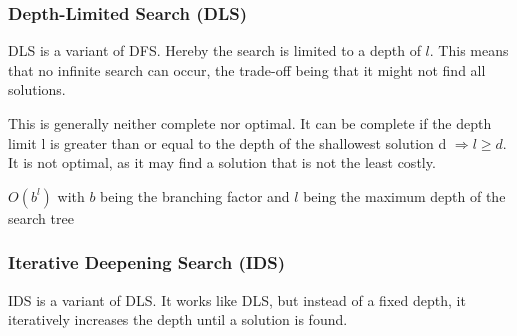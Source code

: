 \documentclass[
../EiKI_Summary.tex,
]
{subfiles}
\begin{document}
\newpage
\subsubsection{Depth-Limited Search (DLS)}
DLS is a variant of DFS. Hereby the search is limited to a depth of $l$. This means that no infinite search can occur, the trade-off being that it might not find all solutions.

\begin{codebox}
    \begin{algorithm}[H]
    \end{algorithm}
\end{codebox}

This is generally neither complete nor optimal. It can be complete if the depth limit l is greater than or equal to the depth of the shallowest solution d $\Rightarrow l \geq d$. It is not optimal, as it may find a solution that is not the least costly.

 $O(b^l)$ with $b$ being the branching factor and $l$ being the maximum depth of the search tree

\subsubsection{Iterative Deepening Search (IDS)}
IDS is a variant of DLS. It works like DLS, but instead of a fixed depth, it iteratively increases the depth until a solution is found.
\end{document}
